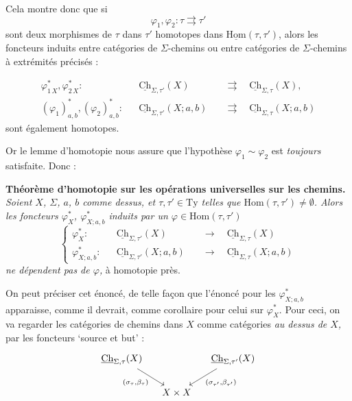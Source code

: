 \documentclass[11pt]{article}
\newcommand{\printedpage}[1]{\marginpar{\footnotesize p.~#1}}
\newcommand{\msp}[1]{\marginpar{\vspace*{10pt}\footnotesize [#1]}}
\newcommand{\uHom}{\underline{\mathrm{Hom}}}
\newcommand{\uCh}{\underline{\mathrm{Ch}}}
\begin{document}
Cela montre donc que si
\[
\varphi_1,\varphi_2:\tau\rightrightarrows\tau'
\]
sont deux morphismes de $\tau$ dans $\tau'$ homotopes dans $\uHom(\tau,\tau')$, alors les foncteurs induits entre catégories de $\Sigma$-chemins ou entre catégories de $\Sigma$-chemins à extrémités précisés : %

\msp{page 97}
\[
\begin{aligned}
\varphi^*_{1\,X},\varphi^*_{2\,X} : && \uCh_{\Sigma,\tau'}(X) &\quad\rightrightarrows\quad\uCh_{\Sigma,\tau}(X),\\
(\varphi_1)^*_{a,b},(\varphi_2)^*_{a,b} : && \uCh_{\Sigma,\tau'}(X;a,b) &\quad\rightrightarrows\quad\uCh_{\Sigma,\tau}(X;a,b)
\end{aligned}
\]
sont également homotopes.

Or le lemme d'homotopie nous assure que l'hypothèse $\varphi_1\sim\varphi_2$ est \textit{toujours} satisfaite. Donc :

\textbf{Théorème d'homotopie sur les opérations universelles sur les chemins.} \textit{Soient $X$, $\Sigma$, $a$, $b$ comme dessus, et $\tau,\tau'\in\mathrm{Ty}$ telles que $\mathrm{Hom}(\tau,\tau')\neq\emptyset$. Alors les foncteurs $\varphi^*_X$, $\varphi^*_{X;a,b}$ induits par un $\varphi\in\mathrm{Hom}(\tau,\tau')$}
\[
\left\{
\begin{aligned}
\varphi^*_X : && \uCh_{\Sigma,\tau'}(X) &\quad\longrightarrow\quad\uCh_{\Sigma,\tau}(X)\\
\varphi^*_{X;a,b} : && \uCh_{\Sigma,\tau'}(X;a,b) &\quad\longrightarrow\quad\uCh_{\Sigma,\tau}(X;a,b)
\end{aligned}
\right.
\]
\textit{ne dépendent pas de $\varphi$,} à homotopie près.

On peut préciser cet énoncé, de telle façon que l'énoncé pour les $\varphi^*_{X;a,b}$ apparaisse, comme il devrait, comme corollaire pour celui sur $\varphi^*_X$. Pour ceci, on va regarder les catégories de chemins dans $X$ comme catégories \textit{au dessus de $X$,} par les foncteurs `source et but' :
\[
\begin{tikzcd}[column sep=small]
\uCh_{\Sigma,\tau}(X) \arrow[dr, "(\sigma_\tau{,}\beta_\tau)"'] & & \uCh_{\Sigma,\tau'}(X) \arrow[dl, "(\sigma_{\tau'}{,}\beta_{\tau'})"]\\
 & X\times X &
\end{tikzcd}
\]

\newpage
\printedpage{63}

\msp{page 98}
\end{document}
